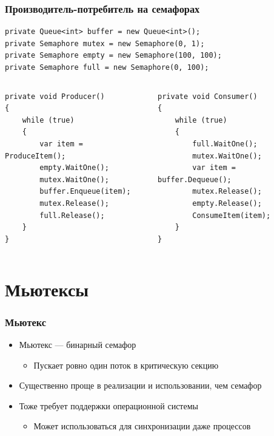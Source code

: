 \documentclass[xetex,mathserif,serif]{beamer}
\begin{document}
	\begin{frame}[fragile]
		\frametitle{Производитель-потребитель на семафорах}
		\begin{footnotesize}
			\begin{verbatim}
private Queue<int> buffer = new Queue<int>();
private Semaphore mutex = new Semaphore(0, 1);
private Semaphore empty = new Semaphore(100, 100);
private Semaphore full = new Semaphore(0, 100);
			\end{verbatim}
			\begin{columns}
				\begin{column}{0.5\textwidth}
					\begin{verbatim}
private void Producer()
{
    while (true)
    {
        var item = ProduceItem();
        empty.WaitOne();
        mutex.WaitOne();
        buffer.Enqueue(item);
        mutex.Release();
        full.Release();
    }
}
					\end{verbatim}
				\end{column}
				\begin{column}{0.5\textwidth}
					\begin{verbatim}
private void Consumer()
{
    while (true)
    {
        full.WaitOne();
        mutex.WaitOne();
        var item = buffer.Dequeue();
        mutex.Release();
        empty.Release();
        ConsumeItem(item);
    }
}
					\end{verbatim}
				\end{column}
			\end{columns}
		\end{footnotesize}
	\end{frame}

	\section{Мьютексы}

	\begin{frame}
		\frametitle{Мьютекс}
		\begin{itemize}
			\item Мьютекс --- бинарный семафор
			\begin{itemize}
				\item Пускает ровно один поток в критическую секцию
			\end{itemize}
			\item Существенно проще в реализации и использовании, чем семафор
			\item Тоже требует поддержки операционной системы
			\begin{itemize}
				\item Может использоваться для синхронизации даже процессов
			\end{itemize}
		\end{itemize}
	\end{frame}
\end{document}
